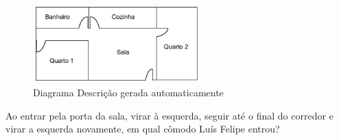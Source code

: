 \begin{escolha}
\begin{boxmedio}
\begin{boxmedio}
{\begin{boxpeq}
\begin{boxpeq}
{\begin{boxpeq}
\begin{boxmedio}
\begin{boxmedio}
\begin{boxpeq}
\begin{boxmedio}
\begin{boxpeq}
\begin{boxpeq}
\begin{boxpeq}
\begin{boxpeq}
\begin{boxmedio}
{\begin{boxmedio}
\begin{boxmedio}
\begin{boxpeq}
\begin{boxmedio}
\begin{boxpeq}
\begin{boxpeq}
\begin{boxpeq}
\begin{escolha}
{\begin{boxmedio}
\begin{boxpeq}
\begin{boxpeq}
\begin{boxpeq}
\begin{boxpeq}
\begin{boxpeq}
\begin{boxmedio}
\begin{boxpeq}
\begin{boxpeq}
\begin{boxpeq}
{\begin{boxpeq}
\begin{boxmedio}
\begin{boxpeq}
\begin{boxpeq}
\begin{boxpeq}
{\begin{boxpeq}
\begin{boxmedio}
{\begin{boxpeq}
\begin{boxpeq}
\begin{boxmedio}
\begin{boxmedio}
\begin{boxpeq}
\begin{boxpeq}
{\begin{boxpeq}
\begin{boxpeq}
\begin{boxpeq}
\begin{boxpeq}
\begin{boxpeq}
\begin{escolha}
\begin{escolha}
{\begin{boxmedio}
\begin{boxpeq}
\begin{q°}
\begin{boxmedio}
\begin{boxpeq}
\begin{boxpeq}
\begin{boxmedio}
\begin{boxmedio}
\begin{boxmedio}
\begin{figure}
\centering
\includegraphics[width=2.52083in,height=1.18147in]{./_SAEB_9_MAT/media/image204.png}
\caption{Diagrama Descrição gerada automaticamente}
\end{figure}


Ao entrar pela porta da sala, virar à esquerda, seguir até o final do
corredor e virar a esquerda novamente, em qual cômodo Luís Felipe entrou?



\end{boxmedio}
\end{boxmedio}
\end{boxmedio}
\end{boxpeq}
\end{boxpeq}
\end{boxmedio}
\end{q°}
\end{boxpeq}
\end{boxmedio}}
\end{escolha}
\end{escolha}
\end{boxpeq}
\end{boxpeq}
\end{boxpeq}
\end{boxpeq}
\end{boxpeq}}
\end{boxpeq}
\end{boxpeq}
\end{boxmedio}
\end{boxmedio}
\end{boxpeq}
\end{boxpeq}}
\end{boxmedio}
\end{boxpeq}}
\end{boxpeq}
\end{boxpeq}
\end{boxpeq}
\end{boxmedio}
\end{boxpeq}}
\end{boxpeq}
\end{boxpeq}
\end{boxpeq}
\end{boxmedio}
\end{boxpeq}
\end{boxpeq}
\end{boxpeq}
\end{boxpeq}
\end{boxpeq}
\end{boxmedio}}
\end{escolha}
\end{boxpeq}
\end{boxpeq}
\end{boxpeq}
\end{boxmedio}
\end{boxpeq}
\end{boxmedio}
\end{boxmedio}}
\end{boxmedio}
\end{boxpeq}
\end{boxpeq}
\end{boxpeq}
\end{boxpeq}
\end{boxmedio}
\end{boxpeq}
\end{boxmedio}
\end{boxmedio}
\end{boxpeq}}
\end{boxpeq}
\end{boxpeq}}
\end{boxmedio}
\end{boxmedio}
\end{escolha}
